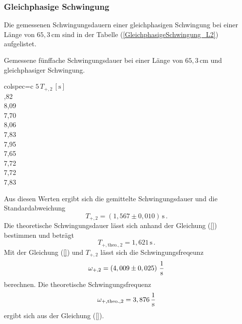 \subsubsection{Gleichphasige Schwingung}
\label{sec:GleichphasigeSchwingung_LangesPendel}
Die gemessenen Schwingungsdauern einer gleichphasigen Schwingung bei einer Länge von $65,3\, \unit{\centi\meter}$ sind in der Tabelle (\ref{GleichphasigeSchwingung_L2})
aufgelistet. 
\begin{table}[H]
  \centering
  \caption{Gemessene fünffache Schwingungsdauer bei einer Länge von $65,3\, \unit{\centi\meter}$ und gleichphasiger Schwingung.}
  \label{tab:GleichphasigeSchwingung_L2}
  \begin{tblr}{colspec={c}}
      \toprule
      $5\, T_{+, 2}\,\left[\unit{\second}\right]$\\
      ,82 \\
      8,09 \\
      7,70 \\
      8,06 \\
      7,83 \\
      7,95 \\
      7,65 \\
      7,72 \\
      7,72 \\
      7,83 \\
      \bottomrule
  \end{tblr}
\end{table}
Aus diesen Werten ergibt sich die gemittelte Schwingungsdauer und die Standardabweichung
$$T_{+,2} = \left( 1,567 \pm 0,010 \right)\, \unit{\second}\,.$$
Die theoretische Schwingungsdauer lässt sich anhand der Gleichung (\ref{}) bestimmen und beträgt
$$T_{+,\text{theo.},2} = 1,621\, \unit{\second}\,.$$
Mit der Gleichung (\ref{}) und $T_{+,2}$ lässt sich die Schwingungsfreqeunz
$$\omega_{+,2} = \left( 4,009 \pm 0,025 \right)\, \unit[per-mode=fraction]{\per\second}$$ berechnen. 
Die theoretische Schwingungsfrequenz 
$$\omega_{+,\text{theo.},2} = 3,876 \, \unit[per-mode=fraction]{\per\second}$$ ergibt sich aus der Gleichung (\ref{}).

%
%
